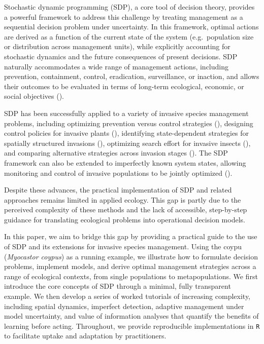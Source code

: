 \documentclass[
  11pt,
  a4paper,
]{article}
\begin{document}
Stochastic dynamic programming (SDP), a core tool of decision theory, provides a powerful framework to address this challenge by treating management as a sequential decision problem under uncertainty. In this framework, optimal actions are derived as a function of the current state of the system (e.g.~population size or distribution across management units), while explicitly accounting for stochastic dynamics and the future consequences of present decisions. SDP naturally accommodates a wide range of management actions, including prevention, containment, control, eradication, surveillance, or inaction, and allows their outcomes to be evaluated in terms of long-term ecological, economic, or social objectives ().

SDP has been successfully applied to a variety of invasive species management problems, including optimizing prevention versus control strategies (), designing control policies for invasive plants (), identifying state-dependent strategies for spatially structured invasions (), optimizing search effort for invasive insects (), and comparing alternative strategies across invasion stages (). The SDP framework can also be extended to imperfectly known system states, allowing monitoring and control of invasive populations to be jointly optimized ().

Despite these advances, the practical implementation of SDP and related approaches remains limited in applied ecology. This gap is partly due to the perceived complexity of these methods and the lack of accessible, step-by-step guidance for translating ecological problems into operational decision models.

In this paper, we aim to bridge this gap by providing a practical guide to the use of SDP and its extensions for invasive species management. Using the coypu (\emph{Myocastor coypus}) as a running example, we illustrate how to formulate decision problems, implement models, and derive optimal management strategies across a range of ecological contexts, from single populations to metapopulations. We first introduce the core concepts of SDP through a minimal, fully transparent example. We then develop a series of worked tutorials of increasing complexity, including spatial dynamics, imperfect detection, adaptive management under model uncertainty, and value of information analyses that quantify the benefits of learning before acting. Throughout, we provide reproducible implementations in \texttt{R} to facilitate uptake and adaptation by practitioners.
\end{document}
